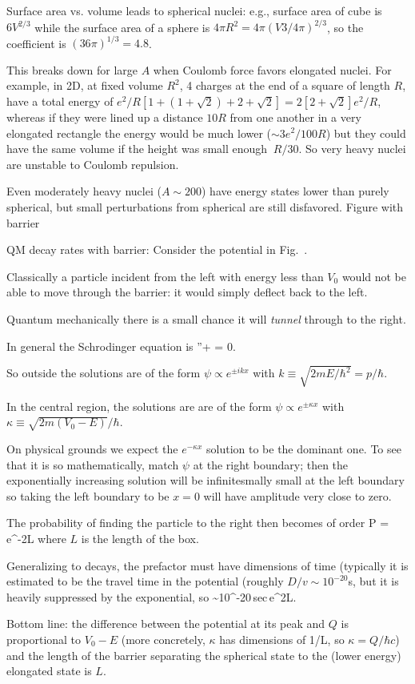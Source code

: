 \documentclass[11pt]{book}
\begin{document}
\bee
\item Surface area vs. volume leads to spherical nuclei: e.g., surface area of cube is $6V^{2/3}$ while the surface area of a sphere is $4\pi R^2 = 4\pi (V3/4\pi)^{2/3}$, so the coefficient is $(36\pi)^{1/3}=4.8$.
\item This breaks down for large $A$ when Coulomb force favors elongated nuclei. For example, in 2D, at fixed volume $R^2$, 4 charges at the end of a square of length $R$, have a total energy of $e^2/R[1+(1+\sqrt{2}) + 2 +\sqrt{2}]=2[2+\sqrt{2}]e^2/R$, whereas if they were lined up a distance $10R$ from one another in a very elongated rectangle the energy would be much lower ($\sim 3e^2/100R$) but they could have the same volume if the height was small enough $~R/30$. So very heavy nuclei are unstable to Coulomb repulsion. 
\item Even moderately heavy nuclei ($A\sim 200$) have energy states lower than purely spherical, but small perturbations from spherical are still disfavored. Figure with barrier
\item QM decay rates with barrier: Consider the potential in Fig.~.
\bei
\item Classically a particle incident from the left with energy less than $V_0$ would not be able to move through the barrier: it would simply deflect back to the left. 
\item Quantum mechanically there is a small chance it will {\it tunnel} through to the right.
\item In general the Schrodinger equation is
\be
\psi''+ = 0.\ee
\item So outside the solutions are of the form $\psi\propto e^{\pm ikx}$ with $k\equiv \sqrt{2mE/\hbar^2}=p/\hbar$. 
\item In the central region, the solutions are are of the form $\psi \propto e^{\pm \kappa x}$ with $\kappa\equiv \sqrt{2m(V_0-E)}/\hbar$.
\item On physical grounds we expect the $e^{-\kappa x}$ solution to be the dominant one. To see that it is so mathematically, match $\psi$ at the right boundary; then the exponentially increasing solution will be infinitesmally small at the left boundary so taking the left boundary to be $x=0$ will have amplitude very close to zero.
\item The probability of finding the particle to the right then becomes of order
\be
P = e^{-2\kappa L}\ee
where $L$ is the length of the box.
\eei
\item Generalizing to decays, the prefactor must have dimensions of time (typically it is estimated to be the travel time in the potential (roughly $D/v\sim 10^{-20}$s, but it is heavily suppressed by the exponential, so
\be
\tau \sim 10^{-20}\,{\rm sec}\,e^{2\kappa L}.\ee
\item Bottom line: the difference between the potential at its peak and $Q$ is proportional to $V_0-E$ (more concretely, $\kappa$ has dimensions of 1/L, so $\kappa = Q/\hbar c$) and the length of the barrier separating the spherical state to the (lower energy) elongated state is $L$. 
\end{document}

